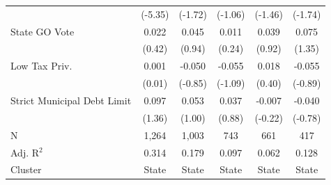 \begin{tabular*}{\textwidth}{@{\extracolsep{\fill}}lccccc}
                               & (-5.35)       & (-1.72)       & (-1.06)      & (-1.46)      & (-1.74)\\   
   State GO Vote               & 0.022          & 0.045          & 0.011         & 0.039         & 0.075\\   
                               & (0.42)        & (0.94)        & (0.24)       & (0.92)       & (1.35)\\   
   Low Tax Priv.               & 0.001          & -0.050         & -0.055        & 0.018         & -0.055\\   
                               & (0.01)        & (-0.85)       & (-1.09)      & (0.40)       & (-0.89)\\   
   Strict Municipal Debt Limit & 0.097          & 0.053          & 0.037         & -0.007        & -0.040\\   
                               & (1.36)        & (1.00)        & (0.88)       & (-0.22)      & (-0.78)\\   
   \hline
   N                & 1,264          & 1,003          & 743           & 661           & 417\\  
   Adj. R$^2$              & 0.314          & 0.179          & 0.097         & 0.062         & 0.128\\  
   Cluster              & State & State & State & State & State\\  
   \bottomrule
\end{tabular*}
\par\endgroup
